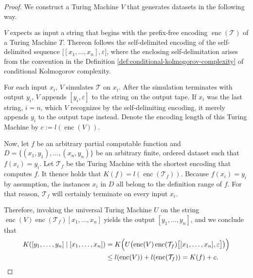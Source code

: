 \begin{proof}
	We construct a Turing Machine $V$ that generates datasets in the following way.
	
	$V$ expects as input a string that begins with the prefix-free encoding $\operatorname{enc}(\mathcal{T})$ of a Turing Machine $T$.
	Thereon follows the self-delimited encoding of the self-delimited sequence $\bigl[[x_1,\dots,x_n],\varepsilon\bigr]$, where the enclosing self-delimitation arises from the convention in the Definition \ref{def:conditional-kolmogorov-complexity} of conditional Kolmogorov complexity.
	
	For each input $x_i$, $V$ simulates $\mathcal{T}$ on $x_i$. 
	After the simulation terminates with output $y_i$, 
	$V$ appends $[y_i,\varepsilon]$ to the string on the output tape.
	If $x_i$ was the last string, $i=n$, which $V$ recognizes by the self-delimiting encoding, it merely appends $y_i$ to the output tape instead.
	Denote the encoding length of this Turing Machine by $c:=l(\operatorname{enc}(V))$.
	
	Now, let $f$ be an arbitrary partial computable function and $D=\{(x_1,y_1),\dots,(x_n,y_n)\}$ be an arbitrary finite, ordered dataset such that $f(x_i)=y_i$.
	Let $\mathcal{T}_f$ be the Turing Machine with the shortest encoding that computes $f$.
	It thence holds that $K(f)=l(\operatorname{enc}(\mathcal{T}_f))$.
	Because $f(x_i)=y_i$ by assumption, the instances $x_i$ in $D$ all belong to the definition range of $f$.
	For that reason, $\mathcal{T}_f$ will certainly terminate on every input $x_i$.
	
	Therefore, invoking the universal Turing Machine $U$ on the string $\operatorname{enc}(V)\operatorname{enc}(\mathcal{T}_f)[x_1,\dots,x_n]$ yields the output $[y_1,\dots,y_n]$, and we conclude that
	\begin{align}
		K([y_1,\dots,y_n] \mid [x_1,\dots,x_n]) 
		&= K\Bigl( U\bigl( \operatorname{enc}(V)\operatorname{enc}(\mathcal{T}_f)\bigl[[x_1,\dots,x_n],\varepsilon\bigr] \bigr) \Bigr)\\
		&\leq l(\operatorname{enc}(V)) + l(\operatorname{enc}(\mathcal{T}_f))
		= K(f) + c.
	\end{align}
\end{proof}

